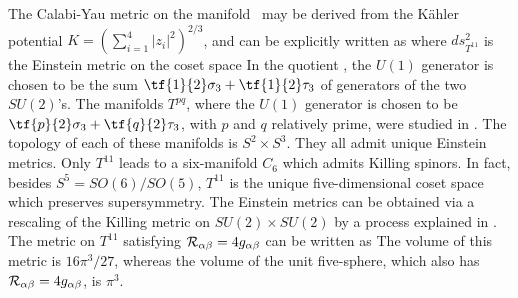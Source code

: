 The Calabi-Yau metric on the manifold \ConEq\ may be derived from 
the K\"ahler
potential $K = \left( \sum_{i=1}^4 |z_i|^2 \right)^{2/3}$, and can be
explicitly written as
 where $ds_{T^{11}}^2$ is the Einstein metric on the coset space
In the quotient \TOneOne, the $U(1)$ generator is chosen to be 
the sum $\tf{1}{2}
\sigma_3 + \tf{1}{2} \tau_3$ of generators of 
the two $SU(2)$'s.  The manifolds $T^{pq}$,
where the $U(1)$ generator is chosen to be $\tf{p}{2} \sigma_3 + \tf{q}{2}
\tau_3$, with $p$ and $q$ relatively prime, were studied in
\cite{Romans:1985an}.  The topology of each of these manifolds is $S^2
\times S^3$.  They all admit unique Einstein metrics.  Only $T^{11}$ leads
to a six-manifold $C_6$ which admits Killing spinors.  In fact, besides
$S^5 = SO(6)/SO(5)$, $T^{11}$ is the unique five-dimensional coset space
which preserves supersymmetry.  The Einstein metrics can be obtained via a
rescaling of the Killing metric on $SU(2) \times SU(2)$ by a process
explained in \cite{Romans:1985an}.  The metric on $T^{11}$ satisfying
${\cal R}_{\alpha\beta} = 4 g_{\alpha\beta}$ can be written as
 The volume of this metric is $16\pi^3/27$, whereas the volume of the
unit five-sphere, which also has ${\cal R}_{\alpha\beta} = 4
g_{\alpha\beta}$, is $\pi^3$.

